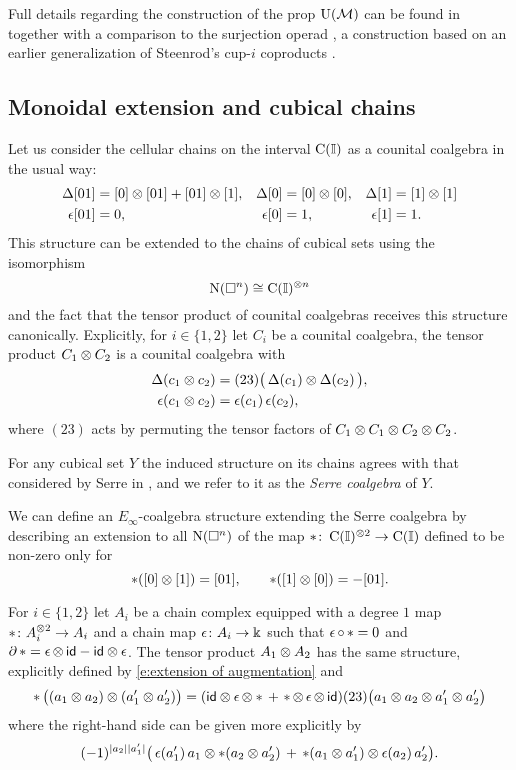 Full details regarding the construction of the prop ${\operatorname{U}(\mathcal{M})}$ can be found in \cite{medina2020prop1} together with a comparison to the surjection operad \cite{mcclure2003multivariable, berger2004combinatorial}, a construction based on an earlier generalization of Steenrod's cup-$i$ coproducts \cite[\S4.5]{benson1998representations}.

\subsection{Monoidal extension and cubical chains}

Let us consider the cellular chains on the interval $\operatorname{C}(\mathbb{I})$ as a counital coalgebra in the usual way:
\begin{align*}
\operatorname{\Delta}[01] &= [0] \otimes [01] + [01] \otimes [1], &
\operatorname{\Delta}[0]  &= [0] \otimes [0], &
\operatorname{\Delta}[1]  &= [1] \otimes [1] \\
\operatorname{\epsilon}[01] &= 0, &
\operatorname{\epsilon}[0]  &= 1, &
\operatorname{\epsilon} [1]  &= 1.
\end{align*}
This structure can be extended to the chains of cubical sets using the isomorphism
\[
\operatorname{N}(\square^n) \cong \operatorname{C}(\mathbb{I})^{\otimes n}
\]
and the fact that the tensor product of counital coalgebras receives this structure canonically.
Explicitly, for $i \in \{1,2\}$ let $C_i$ be a counital coalgebra, the tensor product $C_1 \otimes C_2$ is a counital coalgebra with
\begin{align} \label{e:extension of coproduct}
\operatorname{\Delta}(c_1 \otimes c_2) &= (23) \big( \operatorname{\Delta}(c_1) \otimes \operatorname{\Delta}(c_2) \, \big), \\
\label{e:extension of augmentation}
\operatorname{\epsilon}(c_1 \otimes c_2) &= \operatorname{\epsilon}(c_1) \operatorname{\epsilon}(c_2),
\end{align}
where $(23)$ acts by permuting the tensor factors of $C_1 \otimes C_1 \otimes C_2 \otimes C_2$.

For any cubical set $Y$ the induced structure on its chains agrees with that considered by Serre in \cite{serre1951homologie}, and we refer to it as the \textit{Serre coalgebra} of $Y$.

We can define an $E_\infty$-coalgebra structure extending the Serre coalgebra by describing an extension to all $\operatorname{N}(\square^n)$ of the map $\ast \colon \operatorname{C}(\mathbb{I})^{\otimes 2} \to \operatorname{C}(\mathbb{I})$ defined to be non-zero only for
\[
\ast([0] \otimes [1]) = [01], \qquad
\ast([1] \otimes [0]) = - [01].
\]

For $i \in \{1,2\}$ let $A_i$ be a chain complex equipped with a degree $1$ map $\operatorname{\ast} \colon A_i^{\otimes 2} \to A_i$ and a chain map $\operatorname{\epsilon} \colon A_i \to \Bbbk$ such that $\operatorname{\epsilon} \circ \operatorname{\ast} = 0$ and $\partial \operatorname{\ast} = \operatorname{\epsilon} \otimes \, \mathsf{id} - \mathsf{id} \otimes \operatorname{\epsilon}$.
The tensor product $A_1 \otimes A_2$ has the same structure, explicitly defined by \eqref{e:extension of augmentation} and
\begin{equation} \label{e:extension of product}
\operatorname{\ast} \big( (a_1 \otimes a_2) \otimes (a_1^\prime \otimes a_2^\prime)\big) =
(\mathsf{id} \otimes \operatorname{\epsilon} \otimes \ast \, + \, \operatorname{\ast} \otimes \operatorname{\epsilon} \otimes \, \mathsf{id})(23)
\big( a_1 \otimes a_2 \otimes a_1^\prime \otimes a_2^\prime \big)
\end{equation}
where the right-hand side can be given more explicitly by
\[
(-1)^{\lvert a_2\rvert \lvert a_1^\prime\rvert} \big( \operatorname{\epsilon}(a_1^\prime) \, a_1 \otimes \ast (a_2 \otimes a_2^\prime)  \, + \, \operatorname{\ast}(a_1 \otimes a_1^\prime) \otimes \operatorname{\epsilon}(a_2) \, a_2^\prime \big).
\]

